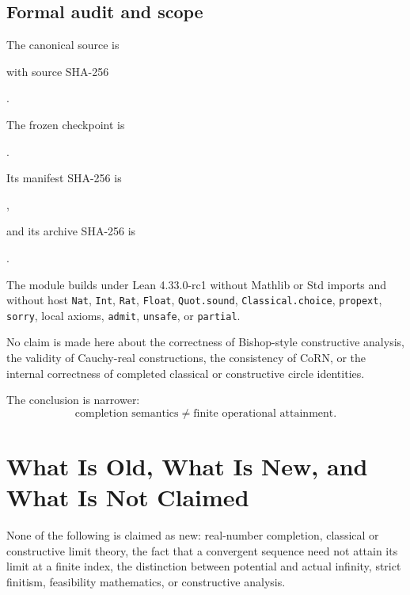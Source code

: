 \documentclass[11pt,a4paper]{article}
\begin{document}
\subsection{Formal audit and scope}

The canonical source is
\begin{center}
\end{center}

with source SHA-256
\begin{center}
.
\end{center}

The frozen checkpoint is
\begin{center}
.
\end{center}

Its manifest SHA-256 is
\begin{center}
,
\end{center}
and its archive SHA-256 is
\begin{center}
.
\end{center}

The module builds under Lean 4.33.0-rc1 without Mathlib or Std imports
and without host \texttt{Nat}, \texttt{Int}, \texttt{Rat},
\texttt{Float}, \texttt{Quot.sound}, \texttt{Classical.choice},
\texttt{propext}, \texttt{sorry}, local axioms, \texttt{admit},
\texttt{unsafe}, or \texttt{partial}.

No claim is made here about the correctness of Bishop-style
constructive analysis, the validity of Cauchy-real constructions, the
consistency of CoRN, or the internal correctness of completed classical
or constructive circle identities.

The conclusion is narrower:
\[
\boxed{
\text{completion semantics}
\neq
\text{finite operational attainment}.
}
\]



\section{What Is Old, What Is New, and What Is Not Claimed}
\label{sec:old-new-not-claimed}

None of the following is claimed as new: real-number completion,
classical or constructive limit theory, the fact that a convergent
sequence need not attain its limit at a finite index, the distinction
between potential and actual infinity, strict finitism, feasibility
mathematics, or constructive analysis.
\end{document}
